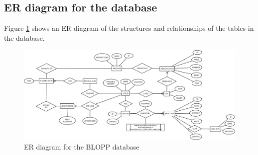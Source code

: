 \subsection{ER diagram for the database}
Figure \ref{fig:db-er-diagram} shows an ER diagram of the structures and relationships
of the tables in the database.

\begin{landscape}
\begin{figure}
	\centering
		\includegraphics[width=0.9\paperheight]{Pictures/ArchPictures/BLOPP_DB_ER_diagram.png}
	\caption{ER diagram for the BLOPP database}
	\label{fig:db-er-diagram}
\end{figure}
\end{landscape}